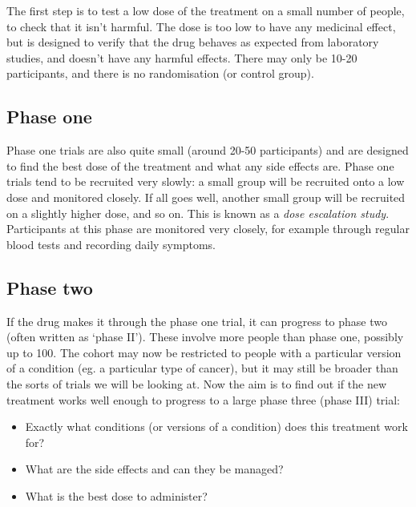 \documentclass[
  openany]{book}
\providecommand{\tightlist}{%
  \setlength{\itemsep}{0pt}\setlength{\parskip}{0pt}}
\theoremstyle{definition}
\theoremstyle{definition}
\theoremstyle{definition}
\theoremstyle{definition}
\theoremstyle{remark}
\begin{document}
The first step is to test a low dose of the treatment on a small number of people, to check that it isn't harmful. The dose is too low to have any medicinal effect, but is designed to verify that the drug behaves as expected from laboratory studies, and doesn't have any harmful effects. There may only be 10-20 participants, and there is no randomisation (or control group).

\hypertarget{phase-one}{%
\subsection*{Phase one}\label{phase-one}}

Phase one trials are also quite small (around 20-50 participants) and are designed to find the best dose of the treatment and what any side effects are. Phase one trials tend to be recruited very slowly: a small group will be recruited onto a low dose and monitored closely. If all goes well, another small group will be recruited on a slightly higher dose, and so on. This is known as a \emph{dose escalation study}. Participants at this phase are monitored very closely, for example through regular blood tests and recording daily symptoms.

\hypertarget{phase-two}{%
\subsection*{Phase two}\label{phase-two}}

If the drug makes it through the phase one trial, it can progress to phase two (often written as `phase II'). These involve more people than phase one, possibly up to 100. The cohort may now be restricted to people with a particular version of a condition (eg. a particular type of cancer), but it may still be broader than the sorts of trials we will be looking at. Now the aim is to find out if the new treatment works well enough to progress to a large phase three (phase III) trial:

\begin{itemize}
\tightlist
\item
  Exactly what conditions (or versions of a condition) does this treatment work for?
\item
  What are the side effects and can they be managed?
\item
  What is the best dose to administer?
\end{itemize}
\end{document}
